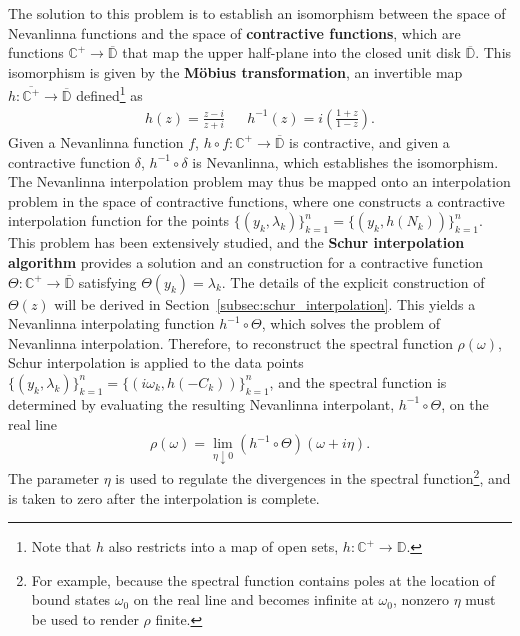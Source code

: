 The solution to this problem is to establish an isomorphism between the space of Nevanlinna functions and the space of \textbf{contractive functions}, which are functions $\mathbb C^+\rightarrow\overline{\mathbb D}$ that map the upper half-plane into the closed unit disk $\overline{\mathbb D}$. This isomorphism is given by the \textbf{M\"obius transformation}, an invertible map $h : \overline{\mathbb C^+}\rightarrow\overline{\mathbb D}$ defined\footnote{Note that $h$ also restricts into a map of open sets, $h : \mathbb C^+\rightarrow\mathbb D$.} as 
\begin{align}
    h(z) = \frac{z - i}{z + i} && h^{-1}(z) = i \left( \frac{1 + z}{1 - z} \right).
\end{align}
Given a Nevanlinna function $f$, $h\circ f : \mathbb C^+\rightarrow\overline{\mathbb D}$ is contractive, and given a contractive function $\delta$, $h^{-1}\circ\delta$ is Nevanlinna, which establishes the isomorphism. The Nevanlinna interpolation problem may thus be mapped onto an interpolation problem in the space of contractive functions, where one constructs a contractive interpolation function for the points $\{(y_k, \lambda_k)\}_{k = 1}^n = \{(y_k, h(N_k))\}_{k = 1}^n$. This problem has been extensively studied, and the \textbf{Schur interpolation algorithm} provides a solution and an construction for a contractive function $\Theta : \mathbb C^+\rightarrow\overline{\mathbb D}$ satisfying $\Theta(y_k) = \lambda_k$. The details of the explicit construction of $\Theta(z)$ will be derived in Section~\ref{subsec:schur_interpolation}. This yields a Nevanlinna interpolating function $h^{-1}\circ\Theta$, which solves the problem of Nevanlinna interpolation. Therefore, to reconstruct the spectral function $\rho(\omega)$, Schur interpolation is applied to the data points $\{(y_k, \lambda_k)\}_{k=1}^n = \{ (i\omega_k, h(-C_k)) \}_{k=1}^n$, and the spectral function is determined by evaluating the resulting Nevanlinna interpolant, $h^{-1}\circ \Theta$, on the real line
\begin{equation}
    \rho(\omega) = \lim_{\eta\downarrow 0}(h^{-1}\circ \Theta)(\omega + i\eta).
\end{equation}
The parameter $\eta$ is used to regulate the divergences in the spectral function\footnote{For example, because the spectral function contains poles at the location of bound states $\omega_0$ on the real line and becomes infinite at $\omega_0$, nonzero $\eta$ must be used to render $\rho$ finite.}, and is taken to zero after the interpolation is complete. 

